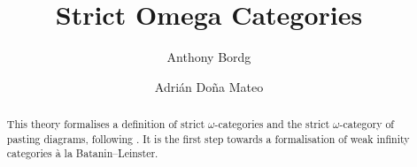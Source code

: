 \documentclass[11pt,a4paper]{article}
\begin{document}
\title{Strict Omega Categories}
\author{Anthony Bordg \and Adrián Doña Mateo}
\maketitle

\begin{abstract}
  This theory formalises a definition of strict $\omega$-categories and the strict $\omega$-category
  of pasting diagrams, following \cite{Leinster2004}. It is the first step towards a formalisation
  of weak infinity categories à la Batanin--Leinster.
\end{abstract}

\tableofcontents





\end{document}
